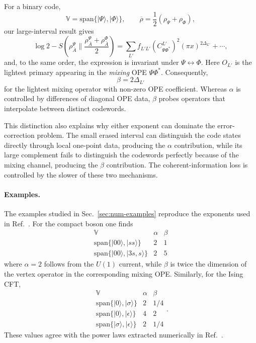 \documentclass[11pt]{article}
\begin{document}
For a binary code,
\begin{equation}
    \mathbb{V}=\mathrm{span}\{|\Psi\rangle,|\Phi\rangle\},
    \qquad
    \overline\rho=\frac12(\rho_\Psi+\rho_\Phi),
\end{equation}
our large-interval result gives
\begin{equation}
\label{eq:qec-beta}
 \log2-
 S\left(
 \rho^\Psi_{\bar A}\bigg\|
 \frac{\rho^\Psi_{\bar A}+\rho^\Phi_{\bar A}}{2}
 \right)
 =
 \sum_{L'}
 f_{L'L'}
 \left(C^{L'}_{\Psi\Phi^*}\right)^2
 (\pi x)^{2\Delta_{L'}}
 +\cdots ,
\end{equation}
and, to the same order, the expression is invariant under
$\Psi\leftrightarrow\Phi$.  Here $O_{L'}$ is the lightest primary
appearing in the \emph{mixing} OPE $\Psi\Phi^*$.
Consequently,
\begin{equation}
    \beta=2\Delta_{L'}
\end{equation}
for the lightest mixing operator with non-zero OPE coefficient.
Whereas $\alpha$ is controlled by differences of diagonal OPE data,
$\beta$ probes operators that interpolate between distinct codewords.

This distinction also explains why either exponent can dominate the
error-correction problem.  The small erased interval can distinguish
the code states directly through local one-point data, producing the
$\alpha$ contribution, while its large complement fails to distinguish
the codewords perfectly because of the mixing channel, producing the
$\beta$ contribution.  The coherent-information loss is controlled by
the slower of these two mechanisms.

\paragraph{Examples.}
The examples studied in Sec.~\ref{sec:num-examples} reproduce the exponents used in
Ref.~\cite{song2026approximatequantumerrorcorrection}.  For the compact boson one finds
\begin{equation}
\begin{array}{c|cc}
\mathbb{V} & \alpha & \beta \\ \hline
\mathrm{span}\{|00\rangle,|ss\rangle\} & 2 & 1\\
\mathrm{span}\{|00\rangle,|3s,s\rangle\} & 2 & 5
\end{array}
\end{equation}
where $\alpha=2$ follows from the $U(1)$ current, while $\beta$ is
twice the dimension of the vertex operator in the corresponding
mixing OPE.  Similarly, for the Ising CFT,
\begin{equation}
\begin{array}{c|cc}
\mathbb{V} & \alpha & \beta \\ \hline
\mathrm{span}\{|0\rangle,|\sigma\rangle\} & 2 & 1/4\\
\mathrm{span}\{|0\rangle,|\epsilon\rangle\} & 4 & 2\\
\mathrm{span}\{|\sigma\rangle,|\epsilon\rangle\} & 2 & 1/4
\end{array}.
\end{equation}
These values agree with the power laws extracted numerically in
Ref.~\cite{song2026approximatequantumerrorcorrection}.
\end{document}
